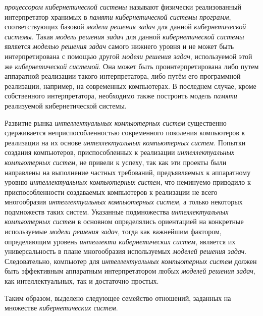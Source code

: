 
\textit{процессором кибернетической системы} называют физически реализованный интерпретатор хранимых в \textit{памяти кибернетической системы} \textit{программ}, соответствующих базовой \textit{модели решения задач} для данной \textit{кибернетической системы}. Такая \textit{модель решения задач} для данной \textit{кибернетической системы} является \textit{моделью решения задач} самого нижнего уровня и не может быть интерпретирована с помощью другой \textit{модели решения задач}, используемой этой же \textit{кибернетической системой}. Она может быть проинтерпретирована либо путем аппаратной реализации такого интерпретатора, либо путём его программной реализации, например, на современных компьютерах. В последнем случае, кроме собственного интерпретатора, необходимо также построить модель \textit{памяти} реализуемой {кибернетической системы}.

Развитие рынка \textit{интеллектуальных компьютерных систем} существенно сдерживается неприспособленностью современного поколения компьютеров к реализации на их основе \textit{интеллектуальных компьютерных систем}. Попытки создания компьютеров, приспособленных к реализации \textit{интеллектуальных компьютерных систем}, не привели к успеху, так как эти проекты были направлены на выполнение частных требований, предъявляемых к аппаратному уровню \textit{интеллектуальных компьютерных систем}, что неминуемо приводило к приспособленности создаваемых компьютеров к реализации не всего многообразия \textit{интеллектуальных компьютерных систем}, а только некоторых подмножеств таких систем. Указанные подмножества \textit{интеллектуальных компьютерных систем} в основном определялись ориентацией на конкретные используемые \textit{модели решения задач}, тогда как важнейшим фактором, определяющим уровень \textit{интеллекта кибернетических систем}, является их универсальность в плане многообразия используемых \textit{моделей решения задач}. Следовательно, компьютер для \textit{интеллектуальных компьютерных систем} должен быть эффективным аппаратным интерпретатором любых \textit{моделей решения задач}, как интеллектуальных, так и достаточно простых.

Таким образом, выделено следующее семейство отношений, заданных на множестве \textit{кибернетических систем}.

\begin{SCn}
\begin{scnindent}
\end{scnindent}
\end{SCn}

